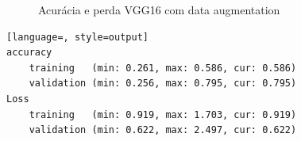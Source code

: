 \begin{figure}[h!]
\centering
\hspace*{-2cm} %
\caption{Acurácia e perda VGG16 com data augmentation}
\end{figure}

\begin{lstlisting}[language=, style=output]
accuracy
	training   (min: 0.261, max: 0.586, cur: 0.586)
	validation (min: 0.256, max: 0.795, cur: 0.795)
Loss
	training   (min: 0.919, max: 1.703, cur: 0.919)
	validation (min: 0.622, max: 2.497, cur: 0.622)
\end{lstlisting}


